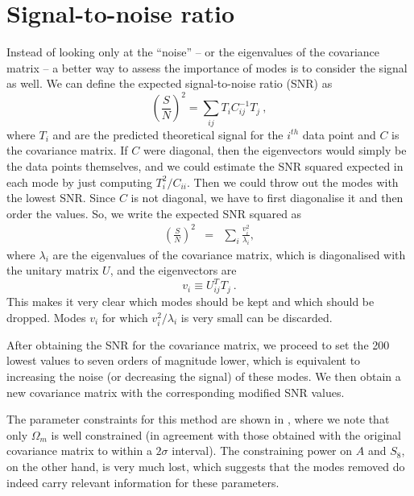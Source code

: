 \documentclass[twocolumn]{\docclass}
\newcommand\be{\begin{equation}}
\newcommand\ee{\end{equation}}
\def\bea{\begin{eqnarray}}
\def\eea{\end{eqnarray}}
\begin{document}
	\section{Signal-to-noise ratio}
	\label{sec:snr}
	
	Instead of looking only at the ``noise'' -- or the eigenvalues of the covariance matrix -- a better way to assess the importance of modes is to consider the signal as well. We can define the expected signal-to-noise ratio (SNR) as
	\be
	\left(\frac{S}{N}\right)^2 = \sum_{ij} T_i C^{-1}_{ij} T_j\
	,\ee
	where $T_i$ and are the predicted theoretical signal for the $i^{th}$ data point and $C$ is the covariance matrix. If $C$ were diagonal, then the eigenvectors would simply be the data points themselves, and we could estimate the SNR squared expected in each mode by just computing $T_i^2/C_{ii}$. Then we could throw out the modes with the lowest SNR. Since $C$ is not diagonal, we have to first diagonalise it and then order the values. So, we write the expected SNR squared as
	\bea
	\left(\frac{S}{N}\right)^2 %
	&=& \sum_{i} \frac{v_i^2}{\lambda_i}
	,\eea
	where $\lambda_i$ are the eigenvalues of the covariance matrix, which is diagonalised with the unitary matrix $U$, and the eigenvectors are 
	\be
	v_i\equiv U_{ij}^T T_j\
	.\ee
	This makes it very clear which modes should be kept and which should be dropped. Modes $v_i$ for which $v_i^2/\lambda_i$ is very small can be discarded. 
	
	After obtaining the SNR for the covariance matrix, we proceed to set the 200 lowest values to seven orders of magnitude lower, which is equivalent to increasing the noise (or decreasing the signal) of these modes. We then obtain a new covariance matrix with the corresponding modified SNR values. 
	
	The parameter constraints for this method are shown in \figref{eig_snr}, where we note that only $\Omega_m$ is well constrained (in agreement with those obtained with the original covariance matrix to within a $2\sigma$ interval). The constraining power on $A$ and $S_8$, on the other hand, is very much lost, which suggests that the modes removed do indeed carry relevant information for these parameters.
	
\end{document}
